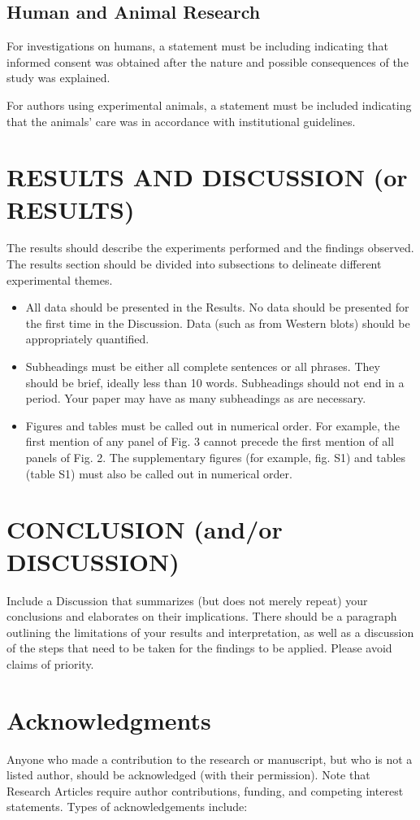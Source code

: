 \documentclass{article}
\begin{document}
\subsection{Human and Animal Research}
For investigations on humans, a statement must be including indicating that informed consent was obtained after the nature and possible consequences of the study was explained.

For authors using experimental animals, a statement must be included indicating that the animals’ care was in accordance with institutional guidelines.

\section{RESULTS AND DISCUSSION (or RESULTS)}
The results should describe the experiments performed and the findings observed. The results section should be divided into subsections to delineate different experimental themes. 
\begin{itemize}
    \item All data should be presented in the Results. No data should be presented for the first time in the Discussion. Data (such as from Western blots) should be appropriately quantified.
    \item Subheadings must be either all complete sentences or all phrases. They should be brief, ideally less than 10 words. Subheadings should not end in a period. Your paper may have as many subheadings as are necessary.
    \item Figures and tables must be called out in numerical order. For example, the first mention of any panel of Fig. 3 cannot precede the first mention of all panels of Fig. 2. The supplementary figures (for example, fig. S1) and tables (table S1) must also be called out in numerical order. 
\end{itemize}

\section{CONCLUSION (and/or DISCUSSION)}
Include a Discussion that summarizes (but does not merely repeat) your conclusions and elaborates on their implications. There should be a paragraph outlining the limitations of your results and interpretation, as well as a discussion of the steps that need to be taken for the findings to be applied. Please avoid claims of priority. 

\section*{Acknowledgments}
Anyone who made a contribution to the research or manuscript, but who is not a listed author, should be acknowledged (with their permission). Note that Research Articles require author contributions, funding, and competing interest statements. Types of acknowledgements include:
\end{document}
